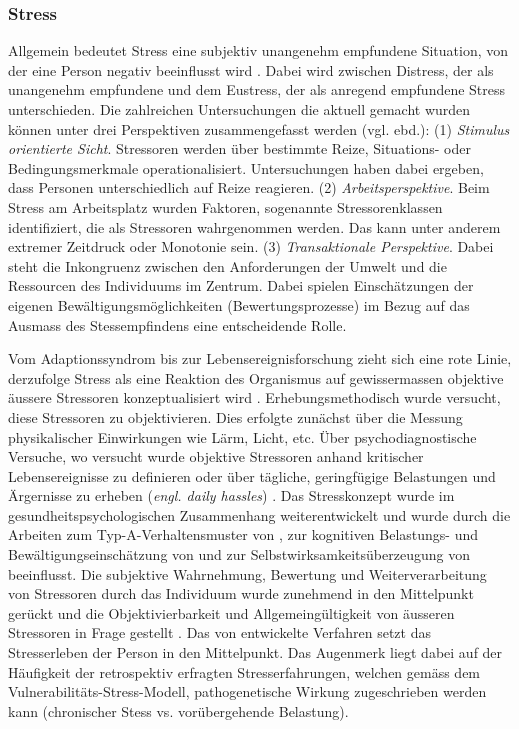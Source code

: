\subsubsection{Stress}\label{sec:Stress}
Allgemein bedeutet Stress eine subjektiv unangenehm empfundene Situation, von der eine Person negativ beeinflusst wird \cite[S.~1500]{Stress2014}. Dabei wird zwischen Distress, der als unangenehm empfundene und dem Eustress, der als anregend empfundene Stress unterschieden. Die zahlreichen Untersuchungen die aktuell gemacht wurden können unter drei Perspektiven zusammengefasst werden (vgl. ebd.): (1) \textit{Stimulus orientierte Sicht}. Stressoren werden über bestimmte Reize, Situations- oder Bedingungsmerkmale operationalisiert. Untersuchungen haben dabei ergeben, dass Personen unterschiedlich auf Reize reagieren. (2) \textit{Arbeitsperspektive}. Beim Stress am Arbeitsplatz wurden Faktoren, sogenannte Stressorenklassen identifiziert, die als Stressoren wahrgenommen werden. Das kann unter anderem extremer Zeitdruck oder Monotonie sein. (3) \textit{Transaktionale Perspektive}. Dabei steht die Inkongruenz zwischen den Anforderungen der Umwelt und die Ressourcen des Individuums im Zentrum. Dabei spielen Einschätzungen der eigenen Bewältigungsmöglichkeiten (Bewertungsprozesse) im Bezug auf das Ausmass des Stessempfindens eine entscheidende Rolle. 

Vom Adaptionssyndrom \cite{Selye1936} bis zur Lebensereignisforschung zieht sich eine rote Linie, derzufolge Stress als eine Reaktion des Organismus auf gewissermassen objektive äussere Stressoren konzeptualisiert wird \cite{Fliege2001}. Erhebungsmethodisch wurde versucht, diese Stressoren zu objektivieren. Dies erfolgte zunächst über die Messung physikalischer Einwirkungen wie Lärm, Licht, etc. Über psychodiagnostische Versuche, wo versucht wurde objektive Stressoren anhand kritischer Lebensereignisse zu definieren \cite{Holmes1980} oder über tägliche, geringfügige Belastungen und Ärgernisse zu erheben (\textit{engl. daily hassles}) \cite{Quast1986}. Das Stresskonzept wurde im gesundheitspsychologischen Zusammenhang weiterentwickelt und wurde durch die Arbeiten zum Typ-A-Verhaltensmuster von , zur kognitiven Belastungs- und Bewältigungseinschätzung von  und zur Selbstwirksamkeitsüberzeugung von  beeinflusst. Die subjektive Wahrnehmung, Bewertung und Weiterverarbeitung von Stressoren durch das Individuum wurde zunehmend in den Mittelpunkt gerückt und die Objektivierbarkeit und Allgemeingültigkeit von äusseren Stressoren in Frage gestellt \cite{Fliege2001}. Das von  entwickelte Verfahren setzt das Stresserleben der Person in den Mittelpunkt. Das Augenmerk liegt dabei auf der Häufigkeit der retrospektiv erfragten Stresserfahrungen, welchen gemäss dem Vulnerabilitäts-Stress-Modell, pathogenetische Wirkung zugeschrieben werden kann (chronischer Stess vs. vorübergehende Belastung).

